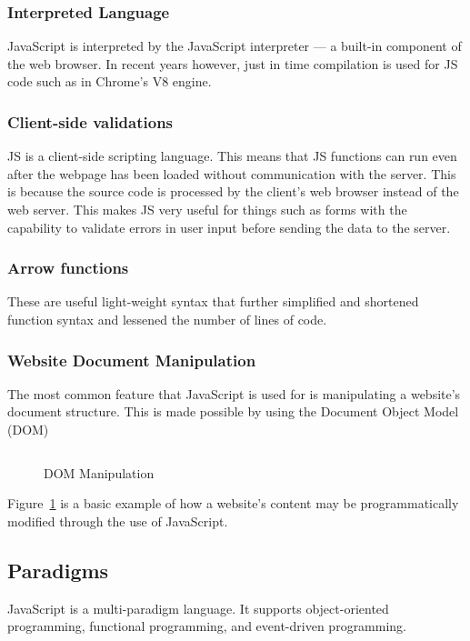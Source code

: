 \documentclass{article}
\newcommand{\js}[1]{\inputminted{javascript}{samples/js/#1.js}}
\begin{document}
    \subsubsection{Interpreted Language}
    JavaScript is interpreted by the JavaScript interpreter --- a built-in
    component of the web browser. In recent years however, just in time
    compilation is used for JS code such as in Chrome’s V8 engine.

    \subsubsection{Client-side validations}
    JS is a client-side scripting language. This means that JS functions can run
    even after the webpage has been loaded without communication with the
    server. This is because the source code is processed by the client’s web
    browser instead of the web server. This makes JS very useful for things such
    as forms with the capability to validate errors in user input before sending
    the data to the server.

    \subsubsection{Arrow functions}
    These are useful light-weight syntax that further simplified and shortened
    function syntax and lessened the number of lines of code.

    \subsubsection{Website Document Manipulation}
    The most common feature that JavaScript is used for is manipulating a
    website's document structure. This is made possible by using the Document
    Object Model (DOM)

    \begin{figure}[ht]
      \js{dom-manipulation}
      \caption{DOM Manipulation}
      \label{fig:dom-manipulation}
    \end{figure}

    Figure~\ref{fig:dom-manipulation} is a basic example of how a website's
    content may be programmatically modified through the use of JavaScript.

  \subsection{Paradigms}
  JavaScript is a multi-paradigm language. It supports object-oriented
  programming, functional programming, and event-driven programming.
\end{document}
